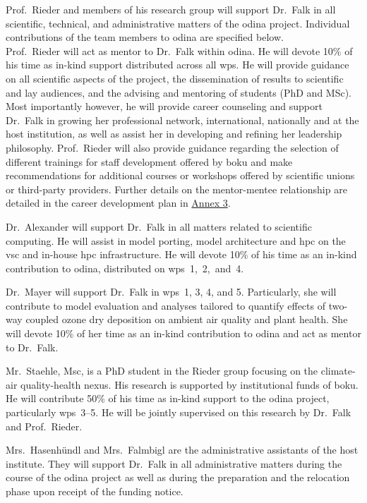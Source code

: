 Prof.~Rieder and members of his research group will support Dr.~Falk in all scientific, technical, and administrative matters of the \gls{odina} project. Individual contributions of the team members to \gls{odina} are specified below.\\

Prof.~Rieder will act as mentor to Dr.~Falk within \gls{odina}. He will devote 10\% of his time as in-kind support distributed across all \glspl{wp}. He will provide guidance on all scientific aspects of the project, the dissemination of results to scientific and lay audiences, and the advising and mentoring of students (PhD and MSc). Most importantly however, he will provide career counseling and support Dr.~Falk in growing her professional network, international, nationally and at the host institution, as well as assist her in developing and refining her leadership philosophy. Prof.~Rieder will also provide guidance regarding the selection of different trainings for staff development offered by \gls{boku} and make recommendations for additional courses or workshops offered by scientific unions or third-party providers. Further details on the mentor-mentee relationship are detailed in the career development plan in \hyperref[appendix:career]{Annex 3}.

Dr.~Alexander will support Dr.~Falk in all matters related to scientific computing. He will assist in model porting, model architecture and \gls{hpc} on the \gls{vsc} and in-house \gls{hpc} infrastructure. He will devote 10\% of his time as an in-kind contribution to \gls{odina}, distributed on \glspl{wp}~1,~2,~and~4. 

Dr.~Mayer will support Dr.~Falk in \glspl{wp}~1, 3, 4, and 5. Particularly, she will contribute to model evaluation and analyses tailored to quantify effects of two-way coupled ozone dry deposition on ambient air quality and plant health. She will devote 10\% of her time as an in-kind contribution to \gls{odina} and act as mentor to Dr.~Falk.    

Mr.~Staehle, Msc, is a PhD student in the Rieder group focusing on the climate-air quality-health nexus. His research is supported by institutional funds of \gls{boku}. He will contribute 50\% of his time as in-kind support to the \gls{odina} project, particularly \glspl{wp}~3--5. He will be jointly supervised on this research by Dr.~Falk and Prof.~Rieder.

Mrs.~Hasenhündl and Mrs.~Falmbigl are the administrative assistants of the host institute. They will support Dr.~Falk in all administrative matters during the course of the \gls{odina} project as well as during the preparation and the relocation phase upon receipt of the funding notice.\\

